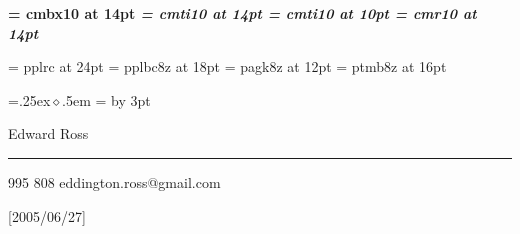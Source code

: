 \def\name{Edward Ross}
\def\addrone{}
\def\addrtwo{}
\def\phone{0403 995 808}
\def\email{eddington.ross@gmail.com}

\font\bf = cmbx10 at 14pt
\font\it = cmti10 at 14pt
\font\smallit = cmti10 at 10pt
\font\rm = cmr10 at 14pt

\def\nameReference#1{{\it #1}}

\font\titleFont = pplrc at 24pt
\font\headFont = pplbc8z at 18pt
\font\infoFont = pagk8z at 12pt
\font\sectionFont = ptmb8z at 16pt


\parskip=0pt
\parindent=0pt

\def\head#1{\vskip2pt\hfil\headFont #1\hfill\vskip3pt}

\def\startSkill{\relax}
\def\skill#1{\rm {\vskip10pt {\sectionFont #1}}\vskip6pt}
\def\endSkill{\relax}

\def\bullet{\leavevmode\raise .25ex\hbox{$\diamond$}\kern.5em}
\newdimen\bulletSize
{}=\hbox{\bullet}
\bulletSize=
\advance\bulletSize by 3pt 
\def\startExp#1#2#3{\rm{\sectionFont #1} \hfill {\it #2}\par\nobreak\vskip1pt\nobreak #3\par\nobreak\vskip2.5pt\nobreak\leftskip=0mm\parskip=1pt}
\def\exp#1{\hangindent=\bulletSize\hangafter=1%
\bullet #1 \par}
\def\endExp{\leftskip=0mm\parskip=0mm\vskip10pt}

\def\description#1{{\rm #1}}


\def\pageHead{\hfil {\titleFont\name} \hfil
\vskip 3pt
\hrule 
\vskip 5pt
{\infoFont\phone} \hfill {\infoFont\markupEmail{\email}}\par
\vskip 2pt}


\ifx\pdfoutput\undefined
\def\markupEmail#1{#1}
\pageHead
\else
 
\beginpackages
  \usepackage{url}[2005/06/27]
  \usepackage{color}
\endpackages
\enablehyperlinks
{}

